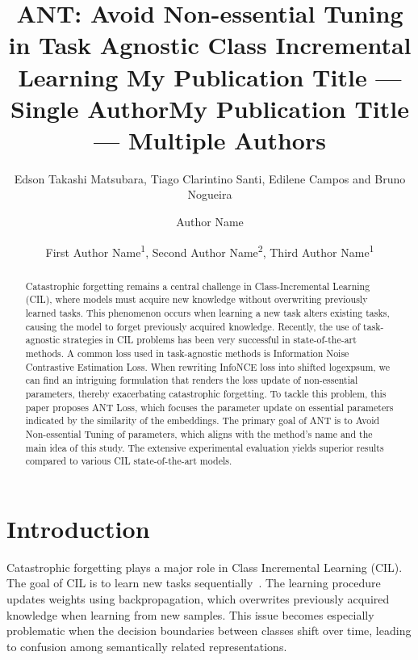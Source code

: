 \documentclass[letterpaper]{article} %
\title{ANT: Avoid Non-essential Tuning in Task Agnostic Class Incremental Learning }
\author{
    Edson Takashi Matsubara, Tiago Clarintino Santi, Edilene Campos and Bruno Nogueira
}
\title{My Publication Title --- Single Author}
\author {
    Author Name
}
\title{My Publication Title --- Multiple Authors}
\author {
    First Author Name\textsuperscript{\rm 1},
    Second Author Name\textsuperscript{\rm 2},
    Third Author Name\textsuperscript{\rm 1}
}
\begin{document}
\maketitle

\begin{abstract}
Catastrophic forgetting remains a central challenge in Class-Incremental Learning (CIL), where models must acquire new knowledge without overwriting previously learned tasks. This phenomenon occurs when learning a new task alters existing tasks, causing the model to forget previously acquired knowledge. Recently, the use of task-agnostic strategies in CIL problems has been very successful in state-of-the-art methods. A common loss used in task-agnostic methods is Information Noise Contrastive Estimation Loss. When rewriting InfoNCE loss into shifted logexpsum, we can find an intriguing formulation that renders the loss update of non-essential parameters, thereby exacerbating catastrophic forgetting. To tackle this problem, this paper proposes ANT Loss, which focuses the parameter update on essential parameters indicated by the similarity of the embeddings. The primary goal of ANT is to Avoid Non-essential Tuning of parameters, which aligns with the method's name and the main idea of this study. The extensive experimental evaluation yields superior results compared to various CIL state-of-the-art models.
\end{abstract}


\section{Introduction}



Catastrophic forgetting plays a major role in Class Incremental Learning (CIL). The goal of CIL is to learn new tasks sequentially~\cite{wang2024comprehensive,de2021continual}. The learning procedure updates weights using backpropagation, which overwrites previously acquired knowledge when learning from new samples. This issue becomes especially problematic when the decision boundaries between classes shift over time, leading to confusion among semantically related representations.
\end{document}
